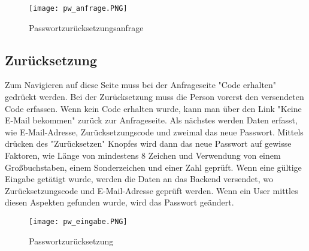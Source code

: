 \begin{center}
\begin{figure}[H]
    \centering
    \texttt{[image: pw\_anfrage.PNG]}
    \caption{Passwortzurücksetzungsanfrage}
\end{figure}
\end{center}
\newpage

\subsection{Zurücksetzung}
Zum Navigieren auf diese Seite muss bei der Anfrageseite "Code erhalten" gedrückt werden. Bei der Zurücksetzung muss die Person vorerst den versendeten Code erfassen. Wenn kein Code erhalten wurde, kann man über den Link "Keine E-Mail bekommen" zurück zur Anfrageseite. Als nächstes werden Daten erfasst, wie E-Mail-Adresse, Zurücksetzungscode und zweimal das neue Passwort.
Mittels drücken des "Zurücksetzen" Knopfes wird dann das neue Passwort auf gewisse Faktoren, wie Länge von mindestens 8 Zeichen und Verwendung von einem Großbuchstaben, einem Sonderzeichen und einer Zahl geprüft.
Wenn eine gültige Eingabe getätigt wurde, werden die Daten an das Backend versendet, wo Zurücksetzungscode und E-Mail-Adresse geprüft werden. Wenn ein User mittles diesen Aspekten gefunden wurde, wird das Passwort geändert.

\begin{center}
\begin{figure}[H]
	\centering
	\texttt{[image: pw\_eingabe.PNG]}
	\caption{Passwortzurücksetzung}
\end{figure}
\end{center}